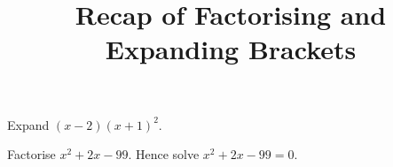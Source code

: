 \documentclass{article}
\begin{document}
\title{Recap of Factorising and Expanding Brackets}
\date{}

\maketitle

\Large

Expand $(x-2)(x+1)^2$.

\vfill


Factorise $x^2+2x-99$. Hence solve $x^2+2x-99=0$.

\vfill
\end{document}
